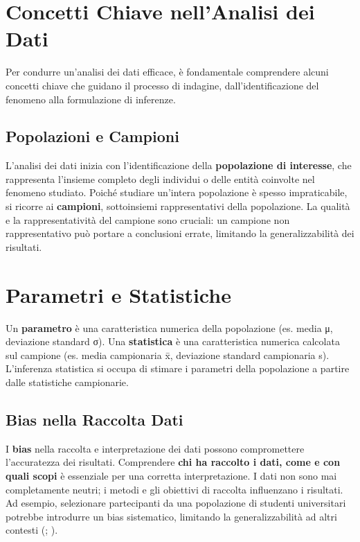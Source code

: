 \documentclass[
  letterpaper,
]{krantz}
\begin{document}
\section{Concetti Chiave nell'Analisi dei
Dati}\label{concetti-chiave-nellanalisi-dei-dati}

Per condurre un'analisi dei dati efficace, è fondamentale comprendere
alcuni concetti chiave che guidano il processo di indagine,
dall'identificazione del fenomeno alla formulazione di inferenze.

\subsection{Popolazioni e Campioni}\label{popolazioni-e-campioni}

L'analisi dei dati inizia con l'identificazione della
\textbf{popolazione di interesse}, che rappresenta l'insieme completo
degli individui o delle entità coinvolte nel fenomeno studiato. Poiché
studiare un'intera popolazione è spesso impraticabile, si ricorre ai
\textbf{campioni}, sottoinsiemi rappresentativi della popolazione. La
qualità e la rappresentatività del campione sono cruciali: un campione
non rappresentativo può portare a conclusioni errate, limitando la
generalizzabilità dei risultati.

\section{Parametri e Statistiche}\label{parametri-e-statistiche}

Un \textbf{parametro} è una caratteristica numerica della popolazione
(es. media μ, deviazione standard σ). Una \textbf{statistica} è una
caratteristica numerica calcolata sul campione (es. media campionaria x̄,
deviazione standard campionaria s). L'inferenza statistica si occupa di
stimare i parametri della popolazione a partire dalle statistiche
campionarie.

\subsection{Bias nella Raccolta Dati}\label{bias-nella-raccolta-dati}

I \textbf{bias} nella raccolta e interpretazione dei dati possono
compromettere l'accuratezza dei risultati. Comprendere \textbf{chi ha
raccolto i dati, come e con quali scopi} è essenziale per una corretta
interpretazione. I dati non sono mai completamente neutri; i metodi e
gli obiettivi di raccolta influenzano i risultati. Ad esempio,
selezionare partecipanti da una popolazione di studenti universitari
potrebbe introdurre un bias sistematico, limitando la generalizzabilità
ad altri contesti (; ).
\end{document}
